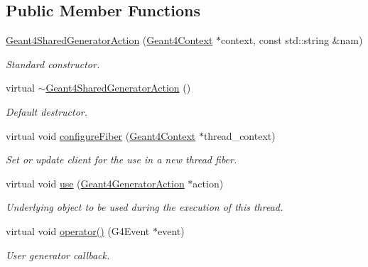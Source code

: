 \subsection*{Public Member Functions}
\begin{DoxyCompactItemize}
\item 
\hyperlink{class_d_d4hep_1_1_simulation_1_1_geant4_shared_generator_action_a85a710a23ad60659956e4d8cba887b45}{Geant4SharedGeneratorAction} (\hyperlink{class_d_d4hep_1_1_simulation_1_1_geant4_context}{Geant4Context} $\ast$context, const std::string \&nam)
\begin{DoxyCompactList}\small\item\em Standard constructor. \item\end{DoxyCompactList}\item 
virtual \hyperlink{class_d_d4hep_1_1_simulation_1_1_geant4_shared_generator_action_a56bf96138bef68d15352b9f6e2a5aa00}{$\sim$Geant4SharedGeneratorAction} ()
\begin{DoxyCompactList}\small\item\em Default destructor. \item\end{DoxyCompactList}\item 
virtual void \hyperlink{class_d_d4hep_1_1_simulation_1_1_geant4_shared_generator_action_a9ca0ac287c96f37ceaa07740c43e7457}{configureFiber} (\hyperlink{class_d_d4hep_1_1_simulation_1_1_geant4_context}{Geant4Context} $\ast$thread\_\-context)
\begin{DoxyCompactList}\small\item\em Set or update client for the use in a new thread fiber. \item\end{DoxyCompactList}\item 
virtual void \hyperlink{class_d_d4hep_1_1_simulation_1_1_geant4_shared_generator_action_af092e3cb7a9419081c990106067fb90c}{use} (\hyperlink{class_d_d4hep_1_1_simulation_1_1_geant4_generator_action}{Geant4GeneratorAction} $\ast$action)
\begin{DoxyCompactList}\small\item\em Underlying object to be used during the execution of this thread. \item\end{DoxyCompactList}\item 
virtual void \hyperlink{class_d_d4hep_1_1_simulation_1_1_geant4_shared_generator_action_a21ff9d287af96c7bb0a3cf8975cac070}{operator()} (G4Event $\ast$event)
\begin{DoxyCompactList}\small\item\em User generator callback. \item\end{DoxyCompactList}\end{DoxyCompactItemize}
